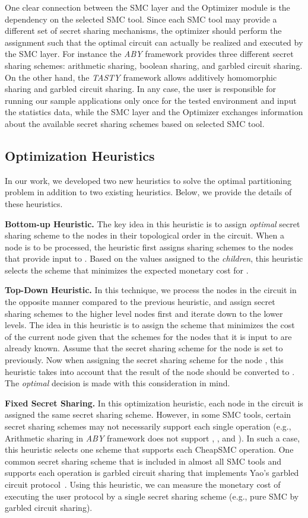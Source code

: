 \documentclass{llncs}
\newcommand{\sysname}{{CheapSMC}\xspace}
\begin{document}
One clear connection between the SMC layer and the Optimizer module is the dependency on the selected SMC tool. Since each SMC tool may provide a different set of secret sharing mechanisms, the optimizer should perform the assignment such that the optimal circuit can actually be realized and executed by the SMC layer. For instance the \emph{ABY} framework provides three different secret sharing schemes: arithmetic sharing, boolean sharing, and garbled circuit sharing. On the other hand, the \emph{TASTY} framework allows additively homomorphic sharing and garbled circuit sharing. In any case, the user is responsible for running our sample applications only once for the tested environment and input the statistics data, while the SMC layer and the Optimizer exchanges information about the available secret sharing schemes based on selected SMC tool.

\subsection{Optimization Heuristics}
\label{sec:system:opt}
In our work, we developed two new heuristics to solve the optimal partitioning problem in addition to two existing heuristics. Below, we provide the details of these heuristics.

\textbf{Bottom-up Heuristic.} The key idea in this heuristic is to assign \emph{optimal} secret sharing scheme to the nodes in their topological order in the circuit. When a node  is to be processed, the heuristic first assigns sharing schemes to the nodes that provide input to . Based on the values assigned to the \emph{children}, this heuristic selects the scheme that minimizes the expected monetary cost for . 

\textbf{Top-Down Heuristic.} In this technique, we process the nodes in the circuit in the opposite manner compared to the previous heuristic, and assign secret sharing schemes to the higher level nodes first and iterate down to the lower levels. The idea in this heuristic is to assign the scheme that minimizes the cost of the current node given that the schemes for the nodes that it is input to are already known. Assume that the secret sharing scheme for the node  is set to  previously. Now when assigning the secret sharing scheme for the node , this heuristic takes into account that the result of the node  should be converted to . The \emph{optimal} decision is made with this consideration in mind. 

\textbf{Fixed Secret Sharing.} In this optimization heuristic, each node in the circuit is assigned the same secret sharing scheme. However, in some SMC tools, certain secret sharing schemes may not necessarily support each single operation (e.g., Arithmetic sharing in \emph{ABY} framework does not support , , and ). In such a case, this heuristic selects one scheme that supports each \sysname operation. One common secret sharing scheme that is included in almost all SMC tools and supports each operation is garbled circuit sharing that implements Yao's garbled circuit protocol~\cite{cite:yao1982protocols}. Using this heuristic, we can measure the monetary cost of executing the user protocol by a single secret sharing scheme (e.g., pure SMC by garbled circuit sharing).
\end{document}
